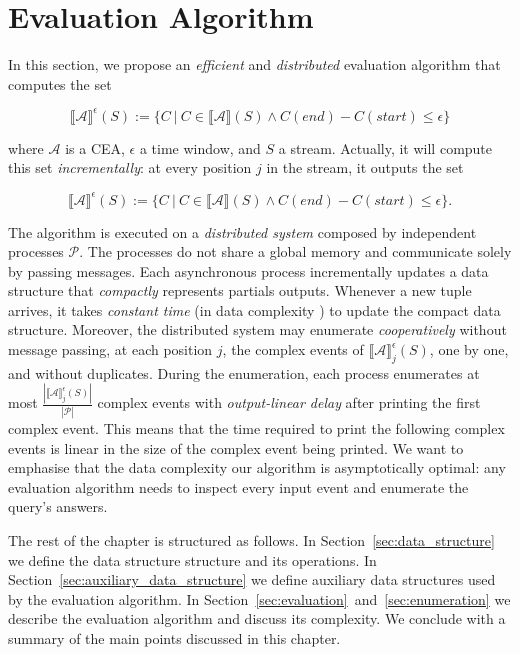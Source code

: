\chapter{Evaluation Algorithm}\label{chapter:algorithm}

In this section, we propose an \emph{efficient} and \emph{distributed} evaluation algorithm that computes the set

\begin{equation*}\label{eq:cea:window}
  {\llbracket \mathcal{A} \rrbracket}^{\epsilon}(S) := \{ C \ | \ C \in {\llbracket \mathcal{A} \rrbracket}(S) \land C(end) - C(start) \le \epsilon\}
\end{equation*}

where $\mathcal{A}$ is a CEA, $\epsilon$ a time window, and $S$ a stream. Actually, it will compute this set \emph{incrementally}: at every position $j$ in the stream, it outputs the set

\begin{equation*}\label{eq:cea:windows:incremental}
  {\llbracket \mathcal{A} \rrbracket}^{\epsilon}(S) := \{ C \ | \ C \in {\llbracket \mathcal{A} \rrbracket}(S) \land C(end) - C(start) \le \epsilon\}.
\end{equation*}

The algorithm is executed on a \emph{distributed system} composed by independent processes $\mathcal{P}$. The processes do not share a global memory and communicate solely by passing messages. Each asynchronous process incrementally updates a data structure that \emph{compactly} represents partials outputs. Whenever a new tuple arrives, it takes \emph{constant time} (in data complexity \cite{data-complexity}) to update the compact data structure. Moreover, the distributed system may enumerate \emph{cooperatively} without message passing, at each position $j$, the complex events of ${\llbracket \mathcal{A} \rrbracket}^{\epsilon}_{j}(S)$, one by one, and without duplicates. During the enumeration, each process enumerates at most $\frac{|{\llbracket \mathcal{A} \rrbracket}^{\epsilon}_{j}(S)|}{|\mathcal{P}|}$ complex events with \emph{output-linear delay} after printing the first complex event. This means that the time required to print the following complex events is linear in the size of the complex event being printed. We want to emphasise that the data complexity our algorithm is asymptotically optimal: any evaluation algorithm needs to inspect every input event and enumerate the query's answers.

The rest of the chapter is structured as follows. In Section~\ref{sec:data_structure} we define the data structure structure and its operations. In Section~\ref{sec:auxiliary_data_structure} we define auxiliary data structures used by the evaluation algorithm. In Section~\ref{sec:evaluation}~and~\ref{sec:enumeration} we describe the evaluation algorithm and discuss its complexity. We conclude with a summary of the main points discussed in this chapter.

